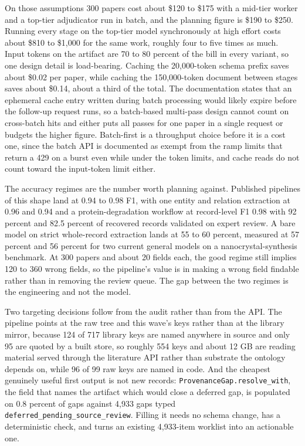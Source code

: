 On those assumptions 300 papers cost about \$120 to \$175 with a mid-tier worker and a
top-tier adjudicator run in batch, and the planning figure is \$190 to \$250. Running every
stage on the top-tier model synchronously at high effort costs about \$810 to \$1,000 for the
same work, roughly four to five times as much. Input tokens on the artifact are 70 to 80
percent of the bill in every variant, so one design detail is load-bearing. Caching the
20,000-token schema prefix saves about \$0.02 per paper, while caching the 150,000-token
document between stages saves about \$0.14, about a third of the total. The documentation states
that an ephemeral cache entry written during batch processing would likely expire before the
follow-up request runs, so a batch-based multi-pass design cannot count on cross-batch hits and
either puts all passes for one paper in a single request or budgets the higher figure.
Batch-first is a throughput choice before it is a cost one, since the batch API is documented
as exempt from the ramp limits that return a 429 on a burst even while under the token limits,
and cache reads do not count toward the input-token limit either.

The accuracy regimes are the number worth planning against. Published pipelines of this shape
land at 0.94 to 0.98 F1, with one entity and relation extraction at 0.96 and 0.94 and a
protein-degradation workflow at record-level F1 0.98 with 92 percent and 82.5 percent of
recovered records validated on expert review. A bare model on strict whole-record extraction
lands at 55 to 60 percent, measured at 57 percent and 56 percent for two current general
models on a nanocrystal-synthesis benchmark. At 300 papers and about 20 fields each, the good
regime still implies 120 to 360 wrong fields, so the pipeline's value is in making a wrong
field findable rather than in removing the review queue. The gap between the two regimes is the
engineering and not the model.

Two targeting decisions follow from the audit rather than from the API. The pipeline points at
the raw tree and this wave's keys rather than at the library mirror, because 124 of 717 library
keys are named anywhere in  source and only 95 are quoted by a built store,
so roughly 554 keys and about 12 GB are reading material served through the literature API
rather than substrate the ontology depends on, while 96 of 99 raw keys are named in code. And
the cheapest genuinely useful first output is not new records: \texttt{ProvenanceGap.resolve\_with},
the field that names the artifact which would close a deferred gap, is populated on 0.8 percent
of gaps against 4,933 gaps typed \texttt{deferred\_pending\_source\_review}. Filling it needs
no schema change, has a deterministic check, and turns an existing 4,933-item worklist into an
actionable one.


